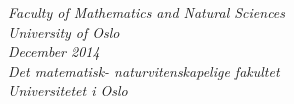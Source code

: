 \begin{center}
  \vspace{5mm}
  \textsl{Faculty of Mathematics and Natural Sciences} \\
  \textsl{University of Oslo} \\
  \vspace{10mm}
  \large
  \textsl{December 2014} \\
  \vspace{5mm}
  \normalsize
  \textsl{Det matematisk- naturvitenskapelige fakultet} \\
  \textsl{Universitetet i Oslo} \\
\end{center}
%

